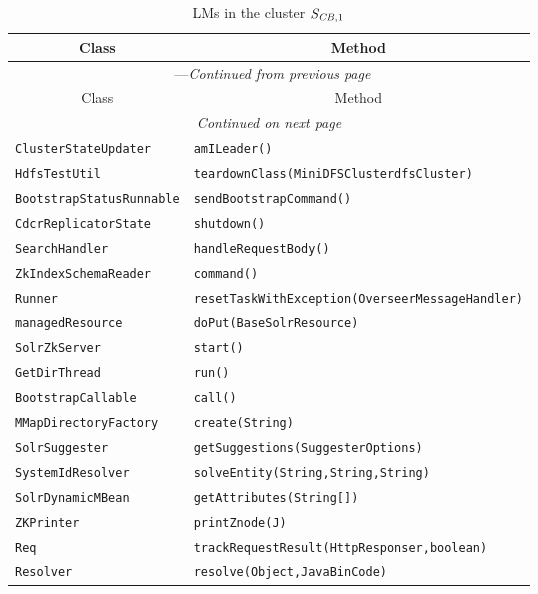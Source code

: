 \begin{center}
\begin{longtable}{ll}
\caption{LMs in the cluster $\mathit{S}_{\mathit{CB},1}$}\\
\toprule\multicolumn{1}{c}{Class}&\multicolumn{1}{c}{Method}\\\midrule
\endfirsthead

\multicolumn{2}{c}{\tablename\ \thetable{}---\textit{Continued from previous page}} \\\midrule
\multicolumn{1}{c}{Class}&\multicolumn{1}{c}{Method}\\\midrule
\endhead
\multicolumn{2}{c}{\textit{Continued on next page}}\\\midrule
\endfoot
\bottomrule
\endlastfoot

\lstinline/ClusterStateUpdater/&{\lstinline/amILeader()/}\\
\lstinline/HdfsTestUtil/&{\lstinline/teardownClass(MiniDFSClusterdfsCluster)/}\\
\lstinline/BootstrapStatusRunnable/&{\lstinline/sendBootstrapCommand()/}\\
\lstinline/CdcrReplicatorState/&{\lstinline/shutdown()/}\\
\lstinline/SearchHandler/&{\lstinline/handleRequestBody()/}\\
\lstinline/ZkIndexSchemaReader/&{\lstinline/command()/}\\
\lstinline/Runner/&{\lstinline/resetTaskWithException(OverseerMessageHandler)/}\\
\lstinline/managedResource/&{\lstinline/doPut(BaseSolrResource)/}\\
\lstinline/SolrZkServer/&{\lstinline/start()/}\\
\lstinline/GetDirThread/&{\lstinline/run()/}\\
\lstinline/BootstrapCallable/&{\lstinline/call()/}\\
\lstinline/MMapDirectoryFactory/&{\lstinline/create(String)/}\\
\lstinline/SolrSuggester/&{\lstinline/getSuggestions(SuggesterOptions)/}\\
\lstinline/SystemIdResolver/&{\lstinline/solveEntity(String,String,String)/}\\
\lstinline/SolrDynamicMBean/&{\lstinline/getAttributes(String[])/}\\
\lstinline/ZKPrinter/&{\lstinline/printZnode(J)/}\\
\lstinline/Req/&{\lstinline/trackRequestResult(HttpResponser,boolean)/}\\
\lstinline/Resolver/&{\lstinline/resolve(Object,JavaBinCode)/}\\

\end{longtable}
\end{center}
